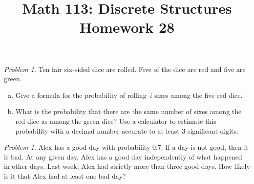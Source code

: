 \documentclass[11pt,twoside]{amsart}
\title{Math 113: Discrete Structures\\ Homework 28}
\theoremstyle{plain}
\theoremstyle{remark}
\newtheorem{prob}[prop]{Problem}
\theoremstyle{definition}
\theoremstyle{definition}
\begin{document}
\maketitle




\begin{prob}
Ten fair six-sided dice are rolled.  Five of the dice are red and five are
green.  
\begin{enumerate}[(a)]
  \item Give a formula for the probability of rolling~$i$ sixes among the five
    red dice.
   \item What is the probability that there are the same number of sixes among
     the red dice as among the green dice?  Use a calculator to estimate this
     probability with a decimal number accurate to at least 3 significant digits.
\end{enumerate}
\end{prob}

\begin{prob}
Alex has a good day with probability 0.7. If a day is not good, then it is bad. At any given day, Alex has a good day independently of what happened in other days. Last week, Alex had strictly more than three good days. How likely is it that Alex had at least one bad day?
\end{prob}
\end{document}
